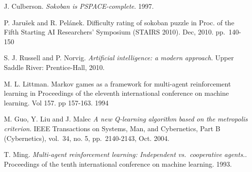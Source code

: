 \documentclass[times, 10pt,twocolumn]{article}
\begin{document}
\begin{thebibliography}{9}
J. Culberson. 
\textit{Sokoban is PSPACE-complete}.
1997.

P. Jarušek and R. Pelánek.
Difficulty rating of sokoban puzzle
in Proc. of the Fifth Starting AI Researchers' Symposium (STAIRS 2010).
Dec, 2010. pp.~140-150

S. J. Russell and P. Norvig.
\textit{Artificial intelligence: a modern approach}.
Upper Saddle River: Prentice-Hall, 2010.

M. L. Littman.
Markov games as a framework for multi-agent
reinforcement learning in Proceedings of the eleventh international
conference on machine learning. Vol 157. pp 157-163. 1994

M. Guo, Y. Liu and J. Malec
\textit{A new Q-learning algorithm based on the metropolis criterion}.
IEEE Transactions on Systems, Man, and Cybernetics, Part B (Cybernetics), vol.~34, no. 5, pp.~2140-2143, Oct. 2004.

T. Ming.
\textit{Multi-agent reinforcement learning: Independent vs.~cooperative agents.}.
Proceedings of the tenth international conference on machine learning. 1993.

\end{thebibliography}
\end{document}
